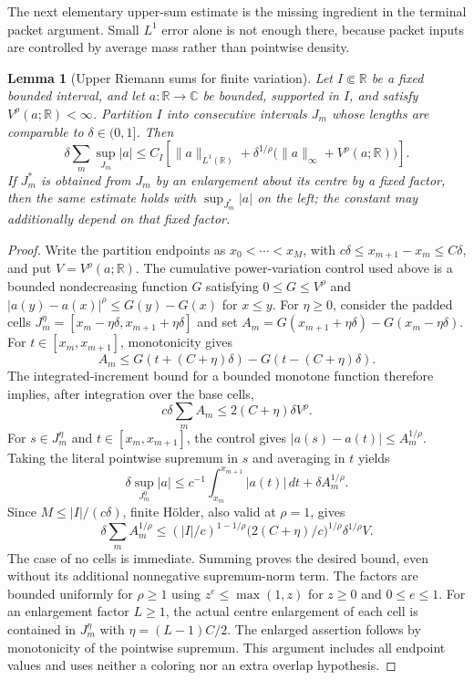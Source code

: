 \documentclass[11pt]{article}
\numberwithin{equation}{section}
\newtheorem{lemma}[theorem]{Lemma}
\theoremstyle{remark}
\theoremstyle{definition}
\newcommand{\R}{\mathbb R}
\begin{document}
The next elementary upper-sum estimate is the missing ingredient in the
terminal packet argument.  Small $L^1$ error alone is not enough there,
because packet inputs are controlled by average mass rather than pointwise
density.

\begin{lemma}[Upper Riemann sums for finite variation]
\label{lem:allq-upper-riemann}
Let $I\Subset\R$ be a fixed bounded interval, and let
$a:\R\to\mathbb C$ be bounded, supported in $I$, and satisfy
$V^\rho(a;\R)<\infty$.  Partition $I$ into consecutive intervals $J_m$
whose lengths are comparable to $\delta\in(0,1]$.  Then
\begin{equation}\label{eq:allq-upper-riemann}
 \delta\sum_m\sup_{J_m}|a|
 \le C_I\left[
 \|a\|_{L^1(\R)}+
 \delta^{1/\rho}\bigl(\|a\|_\infty+V^\rho(a;\R)\bigr)
 \right].
\end{equation}
If $J_m^*$ is obtained from $J_m$ by an enlargement about its centre by a
fixed factor, then the same estimate holds with $\sup_{J_m^*}|a|$ on the
left; the constant may additionally depend on that fixed factor.
\end{lemma}

\begin{proof}
Write the partition endpoints as $x_0<\cdots<x_M$, with
$c\delta\le x_{m+1}-x_m\le C\delta$, and put
$V=V^\rho(a;\R)$.  The cumulative power-variation control used above is a
bounded nondecreasing function $G$ satisfying $0\le G\le V^\rho$ and
$|a(y)-a(x)|^\rho\le G(y)-G(x)$ for $x\le y$.
For $\eta\ge0$, consider the padded cells
$J_m^\eta=[x_m-\eta\delta,x_{m+1}+\eta\delta]$ and set
$A_m=G(x_{m+1}+\eta\delta)-G(x_m-\eta\delta)$.
For $t\in[x_m,x_{m+1}]$, monotonicity gives
\[
 A_m\le G(t+(C+\eta)\delta)-G(t-(C+\eta)\delta).
\]
The integrated-increment bound for a bounded monotone function therefore
implies, after integration over the base cells,
\[
 c\delta\sum_m A_m\le2(C+\eta)\delta V^\rho.
\]
For $s\in J_m^\eta$ and $t\in[x_m,x_{m+1}]$, the control gives
$|a(s)-a(t)|\le A_m^{1/\rho}$.  Taking the literal pointwise supremum in
$s$ and averaging in $t$ yields
\[
 \delta\sup_{J_m^\eta}|a|
 \le c^{-1}\int_{x_m}^{x_{m+1}}|a(t)|\,dt
       +\delta A_m^{1/\rho}.
\]
Since $M\le |I|/(c\delta)$, finite H\"older, also valid at $\rho=1$, gives
\[
 \delta\sum_m A_m^{1/\rho}
 \le (|I|/c)^{1-1/\rho}
       \bigl(2(C+\eta)/c\bigr)^{1/\rho}\delta^{1/\rho}V.
\]
The case of no cells is immediate.  Summing proves the desired bound,
even without its additional nonnegative supremum-norm term.
The factors are bounded uniformly for $\rho\ge1$ using
$z^e\le\max(1,z)$ for $z\ge0$ and $0\le e\le1$.
For an enlargement factor $L\ge1$, the actual centre enlargement of each
cell is contained in $J_m^\eta$ with $\eta=(L-1)C/2$.
The enlarged assertion follows by monotonicity of the pointwise supremum.
This argument includes all endpoint values and uses neither a coloring
nor an extra overlap hypothesis.
\end{proof}
\end{document}
